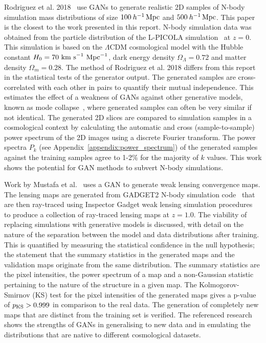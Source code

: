\documentclass[twocolumn]{article}
\numberwithin{equation}{section}
\begin{document}
Rodriguez et al. 2018~\cite{web_gan} use GANs to generate realistic 2D samples of N-body simulation mass distributions 
of size $100 \: h^{-1} \,\textup{Mpc}$ and $500 \: h^{-1} \,\textup{Mpc}$. This paper is the closest to the work 
presented in this report. N-body simulation data was obtained from the particle distribution of the L-PICOLA 
simulation~\cite{LPICOLA} at $z=0$. This simulation is based on the $\Lambda \text{CDM}$ cosmological model with 
the Hubble constant $H_0=70\textup{ km s}^{-1}\textup{ Mpc}^{-1}$, dark energy density $\Omega_\Lambda=0.72$ and
matter density $\Omega_m=0.28$. The method of Rodriguez et al. 2018 differs from this report in the statistical 
tests of the generator output. The generated samples are cross-correlated with each other in pairs to quantify 
their mutual independence. This estimates the effect of a weakness of GANs against other generative models, known
as mode collapse~\cite{gf_gan}, where generated samples can often be very similar if not identical. The generated 
2D slices are compared to simulation samples in a cosmological context by calculating the automatic and cross 
(sample-to-sample) power spectrum of the 2D images using a discrete Fourier transform. The power spectra $P_k$ 
(see Appendix~\ref{appendix:power_spectrum}) of the generated samples against the training samples agree to 1-2\% 
for the majority of $k$ values. This work shows the potential for GAN methods to subvert N-body simulations. 

Work by Mustafa et al.~\cite{cosmogan} uses a GAN to generate weak lensing convergence maps. The lensing maps are 
generated from GADGET2 N-body simulation code~\cite{gadget2} that are then ray-traced using Inspector Gadget weak 
lensing simulation procedures~\cite{mink_funcs, lens_peaks, lens_peak_counts} to produce a collection of ray-traced 
lensing maps at $z=1.0$. The viability of replacing simulations with generative models is discussed, with detail on 
the nature of the separation between the model and data distributions after training. This is quantified by measuring 
the statistical confidence in the null hypothesis; the statement that the summary statistics in the generated maps and 
the validation maps originate from the same distribution. The summary statistics are the pixel intensities, the power 
spectrum of a map and a non-Gaussian statistic pertaining to the nature of the structure in a given map. The 
Kolmogorov-Smirnov (KS) test for the pixel intensities of the generated maps gives a p-value of $p_{\textup{KS}} > 
0.999$ in comparison to the real data. The generation of completely new maps that are distinct from the training set
is verified. The referenced research shows the strengths of GANs in generalising to new data and in emulating the 
distributions that are native to different cosmological datasets.
\end{document}
